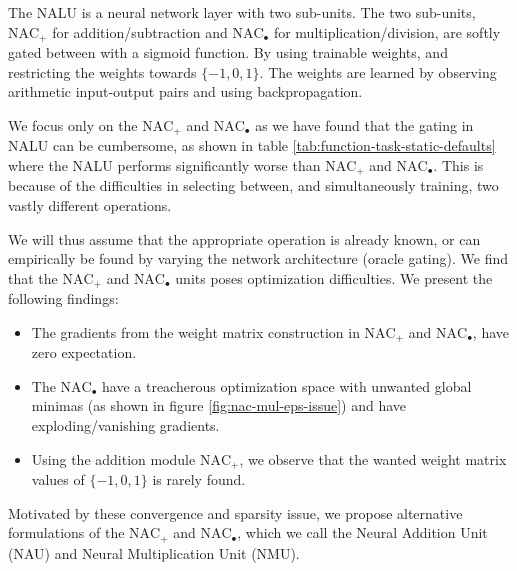 The NALU is a neural network layer with two sub-units. The two sub-units, $\text{NAC}_{+}$ for addition/subtraction and $\text{NAC}_{\bullet}$ for multiplication/division, are softly gated between with a sigmoid function. By using trainable weights, and restricting the weights towards $\{-1,0,1\}$. The weights are learned by observing arithmetic input-output pairs and using backpropagation\cite{rumelhart1986learning}. 

We focus only on the $\text{NAC}_{+}$ and $\text{NAC}_{\bullet}$ as we have found that the gating in NALU can be cumbersome, as shown in table \ref{tab:function-task-static-defaults} where the NALU performs significantly worse than $\text{NAC}_{+}$ and $\text{NAC}_{\bullet}$. This is because of the difficulties in selecting between, and simultaneously training, two vastly different operations.

We will thus assume that the appropriate operation is already known, or can empirically be found by varying the network architecture (oracle gating). We find that the $\text{NAC}_{+}$ and $\text{NAC}_{\bullet}$ units poses optimization difficulties. We present the following findings: 

\begin{itemize}
\item The gradients from the weight matrix construction in $\text{NAC}_{+}$ and $\text{NAC}_{\bullet}$, have zero expectation.

\item The $\text{NAC}_{\bullet}$ have a treacherous optimization space with unwanted global minimas (as shown in figure \ref{fig:nac-mul-eps-issue}) and have exploding/vanishing gradients.

\item Using the addition module $\text{NAC}_{+}$, we observe that the wanted weight matrix values of $\{-1, 0, 1\}$ is rarely found.
\end{itemize}

Motivated by these convergence and sparsity issue, we propose alternative formulations of the $\text{NAC}_{+}$ and $\text{NAC}_{\bullet}$, which we call the Neural Addition Unit (NAU) and Neural Multiplication Unit (NMU).


